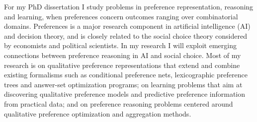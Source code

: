 For my PhD dissertation I study problems in preference representation, 
reasoning and learning, when preferences concern outcomes ranging over
combinatorial domains.
Preferences is a major research component
in artificial intelligence (AI) and decision theory, and is closely related to the 
social choice theory considered by economists and political scientists. In my research I 
will exploit emerging connections between preference reasoning in AI and social choice. 
Most of my research is on qualitative preference representations that extend and combine
existing formalisms such as conditional preference nets, 
lexicographic preference trees and answer-set optimization programs; on 
learning problems that aim at discovering qualitative preference models and 
predictive preference information from practical data; and on
preference reasoning problems centered around qualitative preference optimization 
and aggregation methods.

